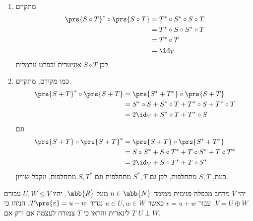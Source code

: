 \documentclass[a4paper,10pt,twoside,openany]{book}
\begin{document}
\begin{solution}
\begin{enumerate}
\begin{align*}
\\&= \pmat{0 & 1 \\ 1 & 0} \pmat{\frac{1}{\sqrt{2}} & \frac{1}{\sqrt{2}} \\ -\frac{1}{\sqrt{2}} & \frac{1}{\sqrt{2}}} + \pmat{\frac{1}{\sqrt{2}} & -\frac{1}{\sqrt{2}} \\ \frac{1}{\sqrt{2}} & \frac{1}{\sqrt{2}}} \pmat{0 & 1 \\ 1 & 0}
\\&=
\pmat{-\frac{1}{\sqrt{2}} & \frac{1}{\sqrt{2}} \\ \frac{1}{\sqrt{2}} & \frac{1}{\sqrt{2}}} + \pmat{-\frac{1}{\sqrt{2}} & \frac{1}{\sqrt{2}} \\ \frac{1}{\sqrt{2}} & \frac{1}{\sqrt{2}}}
\\&= \pmat{-\sqrt{2} & \sqrt{2} \\ \sqrt{2} & \sqrt{2}}
\end{align*}
ואלו מטריצות שונות.

\item מתקיים
\begin{align*}
\prs{S \circ T}^* \circ \prs{S \circ T} &= T^* \circ S^* \circ S \circ T
\\&=
T^* \circ S \circ S^* \circ T
\\&=
T ^* \circ T
\\&=
\id_V
\end{align*}
לכן
$S \circ T$
אוניטרית ובפרט נורמלית.

\item 
כמו מקודם,
מתקיים
\begin{align*}
\prs{S+T}^* \circ \prs{S+T} &= \prs{S^* + T^*} \circ \prs{S+T}
\\&=
S^* \circ S + S^* \circ T + T^* \circ S + T^* \circ T
\\&=
2 \id_V + S^* \circ T + T^* \circ S
\end{align*}
וגם
\begin{align*}
\prs{S+T} \circ \prs{S+T}^* &= \prs{S + T} \circ \prs{S^* + T^*}
\\&= S \circ S^* + S \circ T^* + T \circ S^* + T \circ T^*
\\ \hphantom{\prs{S+T} \circ \prs{S+T}^*} &= 2\id_V + S \circ T^* + T \circ S^*
\end{align*}
כעת,
$S,T$
מתחלפות, לכן גם
$S^*, T$
מתחלפות וגם
$S, T^*$
מתחלפות, ונקבל שוויון.
\end{enumerate}
\end{solution}

\begin{exercisechap}
יהי
$V$
מרחב מכפלה פנימית ממימד
$n \in \mbb{N}$
מעל
$\mbb{R}$.
יהיו
$U,W \leq V$
עבורם
$V = U \oplus W$.
עבור
$v = u + w$
כאשר
$u \in U, w \in W$
נגדיר
$T\prs{v} = u - w$.
הניחו כי
$T$
לינארית והראו כי
$T$
צמודה לעצמה אם ורק אם
$U \perp W$.
\end{exercisechap}
\end{document}
